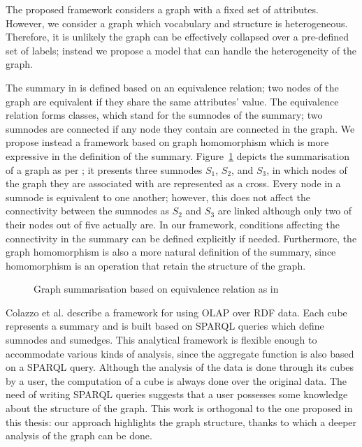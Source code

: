 The proposed framework considers a graph with a fixed set of attributes. However, we consider a graph which vocabulary and structure is heterogeneous. Therefore, it is unlikely the graph can be effectively collapsed over a pre-defined set of labels; instead we propose a model that can handle the heterogeneity of the graph.

The summary in \cite{zhao:sigmod:2011} is defined based on an equivalence relation; two nodes of the graph are equivalent if they share the same attributes' value. The equivalence relation forms classes, which stand for the sumnodes of the summary; two sumnodes are connected if any node they contain are connected in the graph. We propose instead a framework based on graph homomorphism which is more expressive in the definition of the summary. Figure~\ref{fig:graph-cube} depicts the summarisation of a graph as per \cite{zhao:sigmod:2011}; it presents three sumnodes $S_1$, $S_2$, and $S_3$, in which nodes of the graph they are associated with are represented as a cross. Every node in a sumnode is equivalent to one another; however, this does not affect the connectivity between the sumnodes as $S_2$ and $S_3$ are linked although only two of their nodes out of five actually are. In our framework, conditions affecting the connectivity in the summary can be defined explicitly if needed. Furthermore, the graph homomorphism is also a more natural definition of the summary, since homomorphism is an operation that retain the structure of the graph.\\

\begin{figure}
	\centering
	\resizebox{.5\textwidth}{!}{
		
	}
	\caption{Graph summarisation based on equivalence relation as in \cite{zhao:sigmod:2011}}
	\label{fig:graph-cube}
\end{figure}

Colazzo et al. \cite{colazzo:www:2014} describe a framework for using OLAP over RDF data. Each cube represents a summary and is built based on SPARQL queries which define sumnodes and sumedges. This analytical framework is flexible enough to accommodate various kinds of analysis, since the aggregate function is also based on a SPARQL query. Although the analysis of the data is done through its cubes by a user, the computation of a cube is always done over the original data. The need of writing SPARQL queries suggests that a user possesses some knowledge about the structure of the graph. This work is orthogonal to the one proposed in this thesis: our approach highlights the graph structure, thanks to which a deeper analysis of the graph can be done.\\

